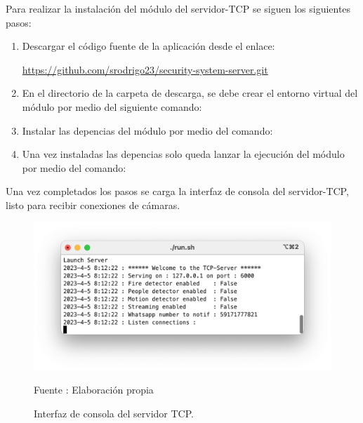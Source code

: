 Para realizar la instalación del módulo del servidor-TCP se siguen los siguientes pasos:
\begin{enumerate}
    \item Descargar el código fuente de la aplicación desde el enlace: \begin{center}
        \url{https://github.com/srodrigo23/security-system-server.git}
    \end{center}
    \item En el directorio de la carpeta de descarga, se debe crear el entorno virtual del módulo por medio del siguiente comando: 
    \begin{center}
    \end{center}
    \item Instalar las depencias del módulo por medio del comando:
    \begin{center}
    \end{center} 
    \item Una vez instaladas las depencias solo queda lanzar la ejecución del módulo por medio del comando:\begin{center}
    \end{center}
\end{enumerate}

Una vez completados los pasos se carga la interfaz de consola del servidor-TCP, listo para recibir conexiones de cámaras.

\begin{figure}[H]
    \begin{center}
        \includegraphics[width=13cm]{img/anexos/mod_tcp.png}
        \caption{Interfaz de consola del servidor TCP.}
        Fuente : Elaboración propia
    \end{center}
\end{figure}
